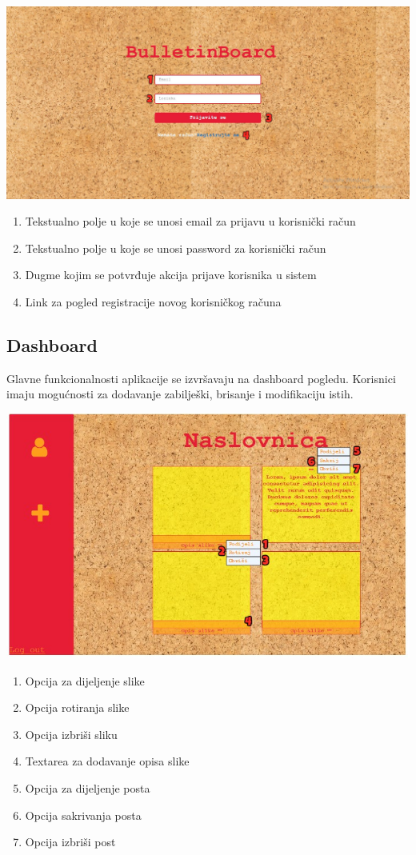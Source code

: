\centerline{\includegraphics[scale=0.5]{slike/login_no.jpg}}
\begin{enumerate}
    \item Tekstualno polje u koje se unosi email za prijavu u korisnički račun
    \item Tekstualno polje u koje se unosi password za korisnički račun
    \item Dugme kojim se potvrđuje akcija prijave korisnika u sistem
    \item Link za pogled registracije novog korisničkog računa
\end{enumerate}

\newpage

\subsection{Dashboard}
Glavne funkcionalnosti aplikacije se izvršavaju na dashboard pogledu. Korisnici imaju mogućnosti za dodavanje zabilješki, brisanje i modifikaciju istih.


\centerline{\includegraphics[scale=0.5]{slike/dash_no.jpg}}
\begin{enumerate}
    \item Opcija za dijeljenje slike 
    \item Opcija rotiranja slike
    \item Opcija izbriši sliku
    \item Textarea za dodavanje opisa slike
    \item Opcija za dijeljenje posta
    \item Opcija sakrivanja posta
    \item Opcija izbriši post
\end{enumerate}

